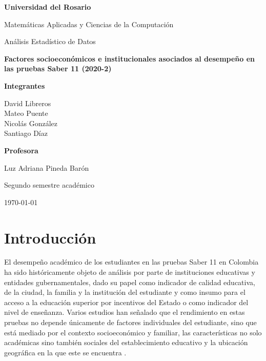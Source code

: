 \documentclass[12pt]{article}
\newcommand{\portadaUniversidad}{Universidad del Rosario}
\newcommand{\portadaPrograma}{Matemáticas Aplicadas y Ciencias de la Computación}
\newcommand{\portadaAsignatura}{Análisis Estadístico de Datos}
\newcommand{\portadaTitulo}{Factores socioeconómicos e institucionales asociados al desempeño en las pruebas Saber 11 (2020-2)}
\newcommand{\portadaIntegrantes}{%
  David Libreros\\
  Mateo Puente \\
  Nicolás González\\
  Santiago Díaz}
\newcommand{\portadaProfesora}{Luz Adriana Pineda Barón}
\newcommand{\portadaFecha}{\today}
\newcommand{\portadaSemestre}{Segundo semestre académico}
\begin{document}
\begin{titlepage}
  \thispagestyle{empty}
  \centering

  {\bfseries \portadaUniversidad\par}
  \vspace{0.6cm}
  {\portadaPrograma\par}
  \vspace{0.4cm}
  {\portadaAsignatura\par}

  \vfill

  {\bfseries \portadaTitulo\par}

  \vfill

  {
    \textbf{Integrantes}\par
    \vspace{0.3cm}
    \portadaIntegrantes\par
    \vspace{0.8cm}
    \textbf{Profesora}\par
    \vspace{0.3cm}
    \portadaProfesora\par
  }

  \vfill

  {
    \portadaSemestre\par
    \portadaFecha\par
  }
\end{titlepage}

\setcounter{page}{1}

\section{Introducción}
El desempeño académico de los estudiantes en las pruebas Saber 11 en Colombia ha sido históricamente objeto de
análisis por parte de instituciones educativas y entidades gubernamentales, dado su papel como indicador de calidad
educativa, de la ciudad, la familia y la institución
del estudiante y como insumo para el acceso a la educación
superior por incentivos del Estado o como indicador del nivel de enseñanza.
Varios estudios han señalado que el rendimiento en estas pruebas
no depende únicamente de factores individuales del estudiante, sino que está mediado
por el contexto socioeconómico y familiar, las características no solo académicas sino
también sociales del establecimiento educativo y la ubicación geográfica en la que este
se encuentra \parencite{garciagil2021}.
\end{document}
